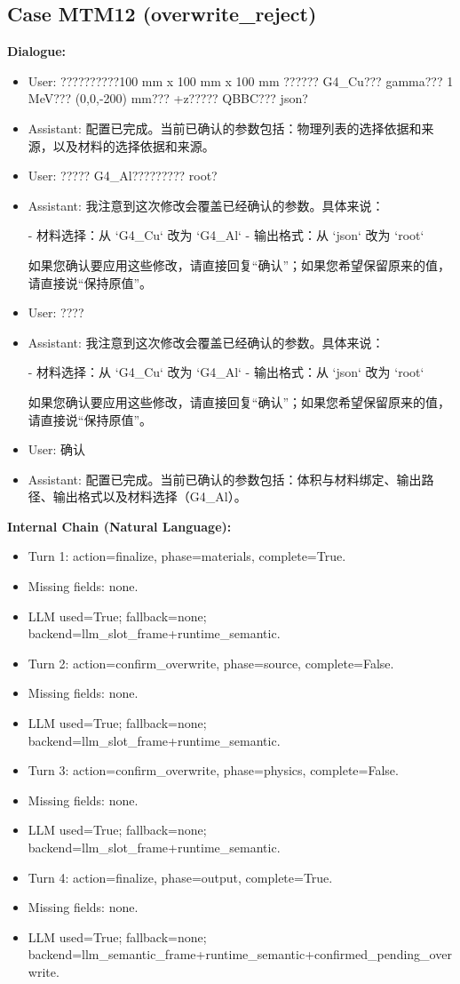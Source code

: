 \documentclass[11pt]{ctexart}
\begin{document}
\subsection{Case MTM12 (overwrite\_reject)}
\textbf{Dialogue:}
\begin{itemize}
\item User: ??????????100 mm x 100 mm x 100 mm ?????? G4\_Cu??? gamma??? 1 MeV??? (0,0,-200) mm??? +z????? QBBC??? json?
\item Assistant: 配置已完成。当前已确认的参数包括：物理列表的选择依据和来源，以及材料的选择依据和来源。
\item User: ????? G4\_Al????????? root?
\item Assistant: 我注意到这次修改会覆盖已经确认的参数。具体来说：

- 材料选择：从 `G4\_Cu` 改为 `G4\_Al`
- 输出格式：从 `json` 改为 `root`

如果您确认要应用这些修改，请直接回复“确认”；如果您希望保留原来的值，请直接说“保持原值”。
\item User: ????
\item Assistant: 我注意到这次修改会覆盖已经确认的参数。具体来说：

- 材料选择：从 `G4\_Cu` 改为 `G4\_Al`
- 输出格式：从 `json` 改为 `root`

如果您确认要应用这些修改，请直接回复“确认”；如果您希望保留原来的值，请直接说“保持原值”。
\item User: 确认
\item Assistant: 配置已完成。当前已确认的参数包括：体积与材料绑定、输出路径、输出格式以及材料选择（G4\_Al）。
\end{itemize}
\textbf{Internal Chain (Natural Language):}
\begin{itemize}
\item Turn 1: action=finalize, phase=materials, complete=True.
\item Missing fields: none.
\item LLM used=True; fallback=none; backend=llm\_slot\_frame+runtime\_semantic.
\item Turn 2: action=confirm\_overwrite, phase=source, complete=False.
\item Missing fields: none.
\item LLM used=True; fallback=none; backend=llm\_slot\_frame+runtime\_semantic.
\item Turn 3: action=confirm\_overwrite, phase=physics, complete=False.
\item Missing fields: none.
\item LLM used=True; fallback=none; backend=llm\_slot\_frame+runtime\_semantic.
\item Turn 4: action=finalize, phase=output, complete=True.
\item Missing fields: none.
\item LLM used=True; fallback=none; backend=llm\_semantic\_frame+runtime\_semantic+confirmed\_pending\_overwrite.
\end{itemize}
\end{document}
